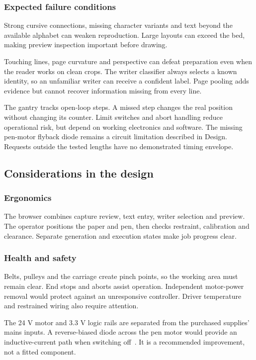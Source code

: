 \subsubsection{Expected failure conditions}
\label{sec:dis-failures}
Strong cursive connections, missing character variants and text beyond the available alphabet can weaken reproduction. Large layouts can exceed the bed, making preview inspection important before drawing.

Touching lines, page curvature and perspective can defeat preparation even when the reader works on clean crops. The writer classifier always selects a known identity, so an unfamiliar writer can receive a confident label. Page pooling adds evidence but cannot recover information missing from every line.

The gantry tracks open-loop steps. A missed step changes the real position without changing its counter. Limit switches and abort handling reduce operational risk, but depend on working electronics and software. The missing pen-motor flyback diode remains a circuit limitation described in Design. Requests outside the tested lengths have no demonstrated timing envelope.

\subsection{Considerations in the design}
\label{sec:dis-considerations}
\subsubsection{Ergonomics}
The browser combines capture review, text entry, writer selection and preview. The operator positions the paper and pen, then checks restraint, calibration and clearance. Separate generation and execution states make job progress clear.

\subsubsection{Health and safety}
Belts, pulleys and the carriage create pinch points, so the working area must remain clear. End stops and aborts assist operation. Independent motor-power removal would protect against an unresponsive controller. Driver temperature and restrained wiring also require attention.

The 24 V motor and 3.3 V logic rails are separated from the purchased supplies' mains inputs. A reverse-biased diode across the pen motor would provide an inductive-current path when switching off~\cite{rohmlowside2026}. It is a recommended improvement, not a fitted component.

